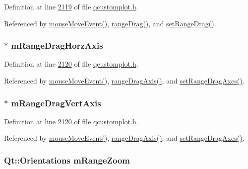 Definition at line \hyperlink{a00116_source_l02119}{2119} of file \hyperlink{a00116_source}{qcustomplot.\+h}.



Referenced by \hyperlink{a00115_source_l07639}{mouse\+Move\+Event()}, \hyperlink{a00116_source_l01964}{range\+Drag()}, and \hyperlink{a00115_source_l06018}{set\+Range\+Drag()}.

\hypertarget{a00116_ae73b7d61e9c0b25088f1cd805fc6f269}{
\subsubsection[{m\+Range\+Drag\+Horz\+Axis}]{$\ast$ m\+Range\+Drag\+Horz\+Axis}}\label{a00116_ae73b7d61e9c0b25088f1cd805fc6f269}


Definition at line \hyperlink{a00116_source_l02120}{2120} of file \hyperlink{a00116_source}{qcustomplot.\+h}.



Referenced by \hyperlink{a00115_source_l07639}{mouse\+Move\+Event()}, \hyperlink{a00115_source_l05853}{range\+Drag\+Axis()}, and \hyperlink{a00115_source_l06049}{set\+Range\+Drag\+Axes()}.

\hypertarget{a00116_a13364bbe1871cc2810ebd8946e30cc49}{
\subsubsection[{m\+Range\+Drag\+Vert\+Axis}]{ $\ast$ m\+Range\+Drag\+Vert\+Axis}}\label{a00116_a13364bbe1871cc2810ebd8946e30cc49}


Definition at line \hyperlink{a00116_source_l02120}{2120} of file \hyperlink{a00116_source}{qcustomplot.\+h}.



Referenced by \hyperlink{a00115_source_l07639}{mouse\+Move\+Event()}, \hyperlink{a00115_source_l05853}{range\+Drag\+Axis()}, and \hyperlink{a00115_source_l06049}{set\+Range\+Drag\+Axes()}.

\hypertarget{a00116_ac12a0fb503fccb899d786ceaa0a1a4f7}{
\subsubsection[{m\+Range\+Zoom}]{\setlength{\rightskip}{0pt plus 5cm}Qt\+::\+Orientations m\+Range\+Zoom}}\label{a00116_ac12a0fb503fccb899d786ceaa0a1a4f7}


